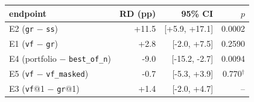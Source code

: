 \begin{tabular}{lrrr}
\toprule
endpoint & RD (pp) & 95\% CI & $p$ \\
\midrule
E2 (\texttt{gr} $-$ \texttt{ss}) & +11.5 & [+5.9, +17.1] & 0.0002 \\
E1 (\texttt{vf} $-$ \texttt{gr}) & +2.8 & [-2.0, +7.5] & 0.2590 \\
E4 (portfolio $-$ \texttt{best\_of\_n}) & -9.0 & [-15.2, -2.7] & 0.0094 \\
E5 (\texttt{vf} $-$ \texttt{vf\_masked}) & -0.7 & [-5.3, +3.9] & 0.770$^\dagger$ \\
E3 (\texttt{vf}@1 $-$ \texttt{gr}@1) & +1.4 & [-2.0, +4.7] & -- \\
\bottomrule
\end{tabular}
